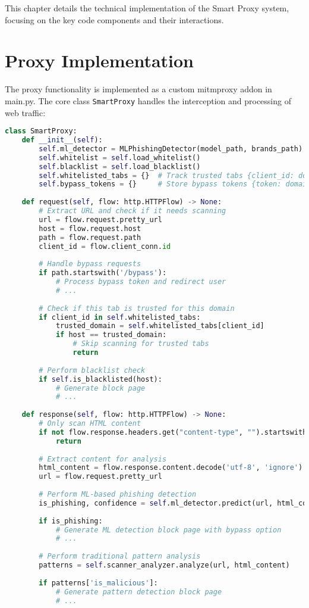 This chapter details the technical implementation of the Smart Proxy system, focusing on the key code components and their interactions.

\section{Proxy Implementation}

The proxy functionality is implemented as a custom mitmproxy addon in main.py. The core class \texttt{SmartProxy} handles the interception and processing of web traffic:

\begin{lstlisting}[language=Python, caption=SmartProxy Class Implementation]
class SmartProxy:
    def __init__(self):
        self.ml_detector = MLPhishingDetector(model_path, brands_path)
        self.whitelist = self.load_whitelist()
        self.blacklist = self.load_blacklist()
        self.whitelisted_tabs = {}  # Track trusted tabs {client_id: domain}
        self.bypass_tokens = {}     # Store bypass tokens {token: domain}
        
    def request(self, flow: http.HTTPFlow) -> None:
        # Extract URL and check if it needs scanning
        url = flow.request.pretty_url
        host = flow.request.host
        path = flow.request.path
        client_id = flow.client_conn.id
        
        # Handle bypass requests
        if path.startswith('/bypass'):
            # Process bypass token and redirect user
            # ...
            
        # Check if this tab is trusted for this domain
        if client_id in self.whitelisted_tabs:
            trusted_domain = self.whitelisted_tabs[client_id]
            if host == trusted_domain:
                # Skip scanning for trusted tabs
                return
                
        # Perform blacklist check
        if self.is_blacklisted(host):
            # Generate block page
            # ...
            
    def response(self, flow: http.HTTPFlow) -> None:
        # Only scan HTML content
        if not flow.response.headers.get("content-type", "").startswith("text/html"):
            return
            
        # Extract content for analysis
        html_content = flow.response.content.decode('utf-8', 'ignore')
        url = flow.request.pretty_url
        
        # Perform ML-based phishing detection
        is_phishing, confidence = self.ml_detector.predict(url, html_content)
        
        if is_phishing:
            # Generate ML detection block page with bypass option
            # ...
            
        # Perform traditional pattern analysis
        patterns = self.scanner_analyzer.analyze(url, html_content)
        
        if patterns['is_malicious']:
            # Generate pattern detection block page
            # ...
\end{lstlisting}

